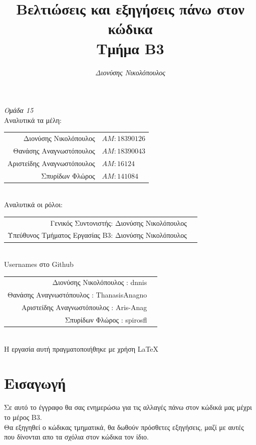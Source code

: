 \documentclass[14pt]{extarticle}
\title{\bf Βελτιώσεις και εξηγήσεις πάνω στον κώδικα \\ Τμήμα B3}
\author{
  \emph{Διονύσης Νικολόπουλος}
}
\begin{document}
\maketitle
\clearpage
\tableofcontents
\clearpage
  \begin{center}
    \large \emph{Ομάδα 15}
    \\
    Αναλυτικά τα μέλη:
\vspace{5mm}
  \begin{tabular}{r l}
    \\Διονύσης Νικολόπουλος & $AM: 18390126$
    \\Θανάσης Αναγνωστόπουλος & $AM: 18390043$
    \\Αριστείδης Αναγνωστόπουλος & $AM: 16124$
    \\Σπυρίδων Φλώρος & $AM: 141084$
  \end{tabular}
\vspace{5mm}
    \\
    Αναλυτικά οι ρόλοι:
    \\
\vspace{5mm}
  \begin{tabular}{r l}
    \small Γενικός Συντονιστής:   Διονύσης Νικολόπουλος
    \\
    \small Υπεύθυνος Τμήματος Εργασίας B3: Διονύσης Νικολόπουλος
  \end{tabular}
\vspace{5mm}
\\
  \textlatin{Usernames} στο \textlatin{Github}
\\
  \vspace{5mm}
  \begin{tabular}{r l}
    \small Διονύσης Νικολόπουλος : \textlatin{dnnis}
    \\
    \small Θανάσης Αναγνωστόπουλος : \textlatin{ThanasisAnagno}
    \\
    \small Αριστείδης Αναγνωστόπουλος : \textlatin{Aris-Anag}
    \\
    \small Σπυρίδων Φλώρος : \textlatin{spirosfl}
  \end{tabular}
  \\
\vspace*{\fill}
    \footnotesize{Η εργασία αυτή πραγματοποιήθηκε με χρήση \LaTeX}
  \end{center}
\clearpage
\section{Εισαγωγή}
Σε αυτό το έγγραφο θα σας ενημερώσω για τις αλλαγές πάνω στον κώδικά μας μέχρι
το μέρος Β3.
\\
Θα εξηγηθεί ο κώδικας τμηματικά, θα δωθούν πρόσθετες εξηγήσεις, μαζί με αυτές που
δίνονται απο τα σχόλια στον κώδικα τον ίδιο.
\\
\end{document}
